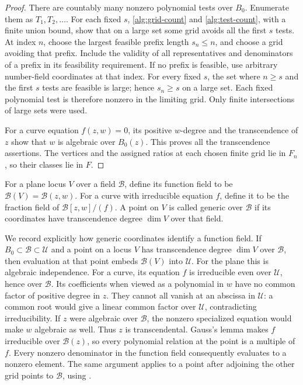 \begin{proof}
There are countably many nonzero polynomial tests over \(B_0\).
Enumerate them as \(T_1,T_2,\ldots\). For each fixed \(s\),
\eqref{alg:grid-count} and \eqref{alg:test-count}, with a finite union
bound, show that on a large set some grid avoids all the first \(s\)
tests. At index \(n\), choose the largest feasible prefix length
\(s_n\le n\), and choose a grid avoiding that prefix. Include the
validity of all representatives and denominators of a prefix in its
feasibility requirement. If no prefix is feasible, use arbitrary
number-field coordinates at that index. For every fixed \(s\), the
set where \(n\ge s\) and the first \(s\) tests are feasible is large;
hence \(s_n\ge s\) on a large set. Each fixed polynomial test is
therefore nonzero in the limiting grid. Only finite intersections of
large sets were used.

For a curve equation \(f(z,w)=0\), its positive \(w\)-degree and the
transcendence of \(z\) show that \(w\) is algebraic over \(B_0(z)\).
This proves all the transcendence assertions. The vertices and the
assigned ratios at each chosen finite grid lie in \(F_n\), so their
classes lie in \(F\).
\end{proof}

For a plane locus \(V\) over a field \(\mathcal B\), define its function
field to be \(\mathcal B(V)=\mathcal B(z,w)\). For a curve with
irreducible equation \(f\), define it to be the fraction field of
\(\mathcal B[z,w]/(f)\). A point on \(V\) is called generic over
\(\mathcal B\) if its coordinates have transcendence degree
\(\dim V\) over that field.

We record explicitly how generic coordinates identify a function field.
If \(B_0\subset\mathcal B\subset\mathcal U\) and a point on a locus
\(V\) has transcendence degree \(\dim V\) over \(\mathcal B\), then
evaluation at that point embeds \(\mathcal B(V)\) into \(\mathcal U\).
For the plane this is algebraic independence. For a curve, its equation
\(f\) is irreducible even over \(\mathcal U\), hence over
\(\mathcal B\). Its coefficients when viewed as a polynomial in \(w\)
have no common factor of positive degree in \(z\). They cannot all
vanish at an abscissa in \(\mathcal U\): a common root would give a
linear common factor over \(\mathcal U\), contradicting
irreducibility. If \(z\) were algebraic over \(\mathcal B\), the
nonzero specialized equation would make \(w\) algebraic as well.
Thus \(z\) is transcendental. Gauss's lemma makes \(f\)
irreducible over \(\mathcal B(z)\), so every polynomial relation at the
point is a multiple of \(f\). Every nonzero denominator in the function
field consequently evaluates to a nonzero element. The same argument
applies to a point after adjoining the other grid points to
\(\mathcal B\), using .

